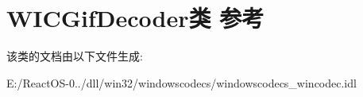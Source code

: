 \hypertarget{class_w_i_c_gif_decoder}{}\section{W\+I\+C\+Gif\+Decoder类 参考}
\label{class_w_i_c_gif_decoder}


该类的文档由以下文件生成\+:\begin{DoxyCompactItemize}
\item 
E\+:/\+React\+O\+S-\/0../dll/win32/windowscodecs/windowscodecs\+\_\+wincodec.\+idl\end{DoxyCompactItemize}
